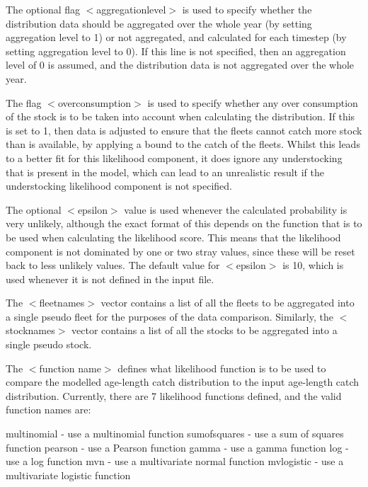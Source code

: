 \documentclass [a4paper, 10pt]{book}
\begin{document}
The optional flag $<$aggregationlevel$>$ is used to specify whether the distribution data should be aggregated over the whole year (by setting aggregation level to 1) or not aggregated, and calculated for each timestep (by setting aggregation level to 0).  If this line is not specified, then an aggregation level of 0 is assumed, and the distribution data is not aggregated over the whole year.

\bigskip
The flag $<$overconsumption$>$ is used to specify whether any over consumption of the stock is to be taken into account when calculating the distribution.  If this is set to 1, then data is adjusted to ensure that the fleets cannot catch more stock than is available, by applying a bound to the catch of the fleets.  Whilst this leads to a better fit for this likelihood component, it does ignore any understocking that is present in the model, which can lead to an unrealistic result if the understocking likelihood component is not specified.

\bigskip
The optional $<$epsilon$>$ value is used whenever the calculated probability is very unlikely, although the exact format of this depends on the function that is to be used when calculating the likelihood score.  This means that the likelihood component is not dominated by one or two stray values, since these will be reset back to less unlikely values.  The default value for $<$epsilon$>$ is 10, which is used whenever it is not defined in the input file.

\bigskip
The $<$fleetnames$>$ vector contains a list of all the fleets to be aggregated into a single pseudo fleet for the purposes of the data comparison.  Similarly, the $<$stocknames$>$ vector contains a list of all the stocks to be aggregated into a single pseudo stock.

\bigskip
The $<$function name$>$ defines what likelihood function is to be used to compare the modelled age-length catch distribution to the input age-length catch distribution.  Currently, there are 7 likelihood functions defined, and the valid function names are:

\bigskip
multinomial - use a multinomial function\newline
sumofsquares - use a sum of squares function\newline
pearson - use a Pearson function\newline
gamma - use a gamma function\newline
log - use a log function\newline
mvn - use a multivariate normal function\newline
mvlogistic - use a multivariate logistic function
\end{document}
